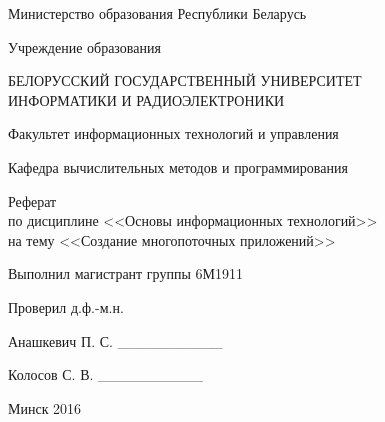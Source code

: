 \begin{titlepage}
\thispagestyle{empty}
\setlength{\parindent}{0cm} %

{\centering{}
  Министерство образования Республики Беларусь

  \smallskip
  Учреждение образования

  БЕЛОРУССКИЙ ГОСУДАРСТВЕННЫЙ УНИВЕРСИТЕТ \\
  ИНФОРМАТИКИ И РАДИОЭЛЕКТРОНИКИ

  \smallskip
  Факультет информационных технологий и управления

  \smallskip
  Кафедра вычислительных методов и программирования\par
}

\vspace{60mm}

{\centering{}
  Реферат \\
  по дисциплине <<Основы информационных технологий>> \\
  на тему <<Создание многопоточных приложений>>\par
}

\vspace{60mm}

\begin{minipage}{.55\linewidth}
  Выполнил магистрант группы 6М1911

  \smallskip
  Проверил д.ф.-м.н.
\end{minipage}
\hfill
\begin{minipage}{.4\linewidth}
  \begin{flushright}
    Анашкевич П. С. \_\_\_\_\_\_\_\_\_\_

    \smallskip
    Колосов С. В. \_\_\_\_\_\_\_\_\_\_ %
  \end{flushright}
\end{minipage}

\vfill
{\centering{}
  Минск 2016\par
}

\setlength{\parindent}{1.25cm} %
\end{titlepage}
